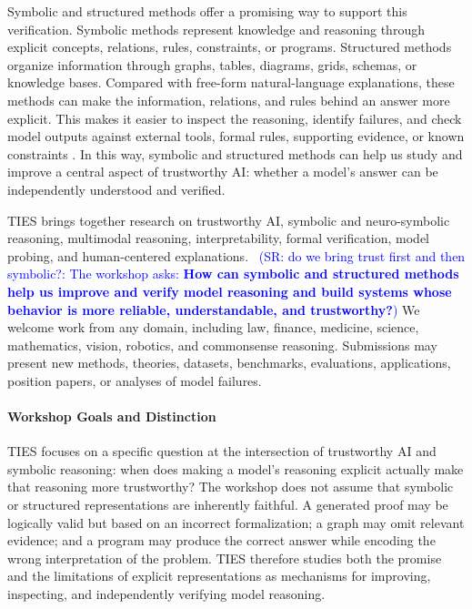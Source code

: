 \documentclass[11pt]{article}
\newcommand{\sr}[1]{{\textcolor{blue}{~(SR: #1)}}}
\begin{document}
Symbolic and structured methods offer a promising way to support this
verification. Symbolic methods represent knowledge and reasoning through
explicit concepts, relations, rules, constraints, or programs. Structured
methods organize information through graphs, tables, diagrams, grids,
schemas, or knowledge bases. Compared with free-form natural-language
explanations, these methods can make the information, relations, and rules
behind an answer more explicit. This makes it easier to inspect the
reasoning, identify failures, and check model outputs against external
tools, formal rules, supporting evidence, or known constraints
\citep{pan-etal-2023-logic,olausson-etal-2023-linc,
pei-etal-2025-fover}. In this way, symbolic and structured methods can help
us study and improve a central aspect of trustworthy AI: whether a model's
answer can be independently understood and verified.

TIES brings together research on trustworthy AI,
symbolic and neuro-symbolic reasoning, multimodal reasoning,
interpretability, formal verification, model probing, and human-centered
explanations. \sr{ do we bring trust first and then symbolic?: The workshop asks: \textbf{How can symbolic and structured
methods help us improve and verify model reasoning and build systems whose
behavior is more reliable, understandable, and trustworthy?}} We welcome
work from any domain, including law, finance, medicine, science,
mathematics, vision, robotics, and commonsense reasoning. Submissions may
present new methods, theories, datasets, benchmarks, evaluations,
applications, position papers, or analyses of model failures.
\paragraph{Workshop Goals and Distinction}

TIES focuses on a specific question at the intersection of trustworthy
AI and symbolic reasoning: when does making a model's reasoning explicit
actually make that reasoning more trustworthy? The workshop does not
assume that symbolic or structured representations are inherently
faithful. A generated proof may be logically valid but based on an
incorrect formalization; a graph may omit relevant evidence; and a
program may produce the correct answer while encoding the wrong
interpretation of the problem. TIES therefore studies both the promise
and the limitations of explicit representations as mechanisms for
improving, inspecting, and independently verifying model reasoning.
\end{document}
